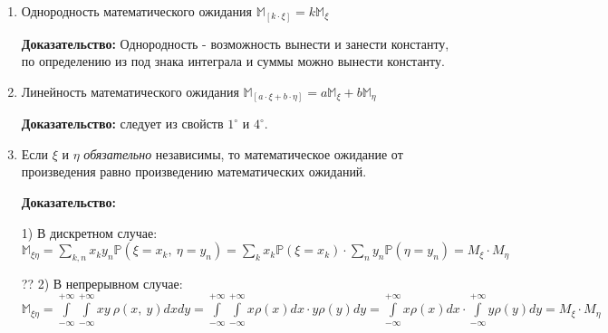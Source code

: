 \documentclass[../Main.tex]{subfiles}
\begin{document}
\begin{enumerate}
    \item Однородность математического ожидания \(\mathbb{M}_{[k \cdot \xi]} = k \mathbb{M}_\xi\)
    
    \textbf{Доказательство:} Однородность - возможность вынести и занести константу, по определению из под знака интеграла и суммы можно вынести константу.

    \item Линейность математического ожидания \(\mathbb{M}_{[a \cdot \xi + b \cdot \eta]} = a \mathbb{M}_\xi + b \mathbb{M}_\eta\)

    \textbf{Доказательство:} следует из свойств \(1^\circ\) и \(4^\circ\).

    \item Если \(\xi\) и \(\eta\) \textit{обязательно} независимы, то математическое ожидание от произведения равно произведению математических ожиданий.

    \textbf{Доказательство:} 

    1) В дискретном случае: \(\mathbb{M}_{\xi \eta} = \underset{k, n}{\sum}x_ky_n\mathbb{P}(\xi = x_k,\ \eta = y_n) = \underset{k}{\sum}x_k\mathbb{P}(\xi = x_k) \cdot \underset{n}{\sum}y_n\mathbb{P}(\eta = y_n) = M_\xi \cdot M_\eta\)

    ?? 2) В непрерывном случае: \(\mathbb{M}_{\xi \eta} = \overset{+\infty}{\underset{-\infty}{\int}}\overset{+\infty}{\underset{-\infty}{\int}}xy\ \rho(x,\ y)dxdy = \overset{+\infty}{\underset{-\infty}{\int}}\overset{+\infty}{\underset{-\infty}{\int}}x\rho(x)dx \cdot y\rho(y)dy =\overset{+\infty}{\underset{-\infty}{\int}}x\rho(x)dx \cdot \overset{+\infty}{\underset{-\infty}{\int}}y\rho(y)dy = M_\xi \cdot M_\eta\)

\end{enumerate}

\end{document}
